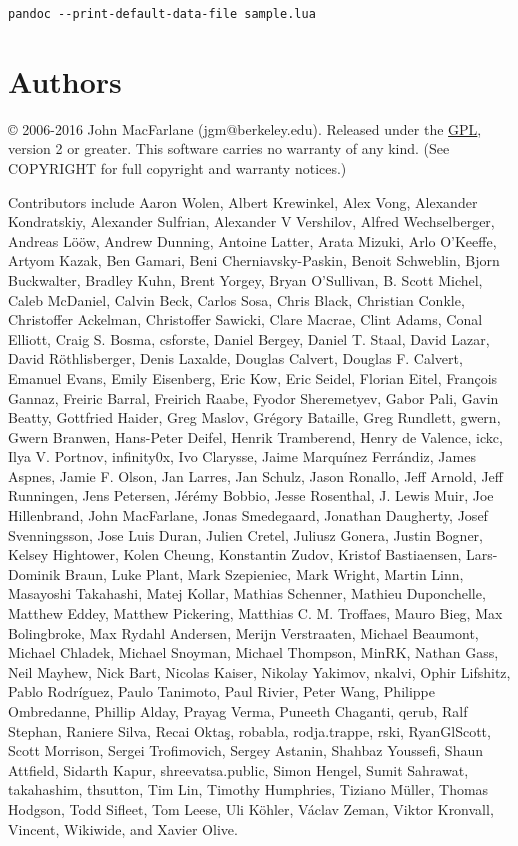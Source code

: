 \documentclass[]{article}
\begin{document}
\begin{verbatim}
pandoc --print-default-data-file sample.lua
\end{verbatim}

\section{Authors}\label{authors}

© 2006-2016 John MacFarlane (jgm@berkeley.edu). Released under the
\href{http://www.gnu.org/copyleft/gpl.html}{GPL}, version 2 or greater.
This software carries no warranty of any kind. (See COPYRIGHT for full
copyright and warranty notices.)

Contributors include Aaron Wolen, Albert Krewinkel, Alex Vong, Alexander
Kondratskiy, Alexander Sulfrian, Alexander V Vershilov, Alfred
Wechselberger, Andreas Lööw, Andrew Dunning, Antoine Latter, Arata
Mizuki, Arlo O'Keeffe, Artyom Kazak, Ben Gamari, Beni
Cherniavsky-Paskin, Benoit Schweblin, Bjorn Buckwalter, Bradley Kuhn,
Brent Yorgey, Bryan O'Sullivan, B. Scott Michel, Caleb McDaniel, Calvin
Beck, Carlos Sosa, Chris Black, Christian Conkle, Christoffer Ackelman,
Christoffer Sawicki, Clare Macrae, Clint Adams, Conal Elliott, Craig S.
Bosma, csforste, Daniel Bergey, Daniel T. Staal, David Lazar, David
Röthlisberger, Denis Laxalde, Douglas Calvert, Douglas F. Calvert,
Emanuel Evans, Emily Eisenberg, Eric Kow, Eric Seidel, Florian Eitel,
François Gannaz, Freiric Barral, Freirich Raabe, Fyodor Sheremetyev,
Gabor Pali, Gavin Beatty, Gottfried Haider, Greg Maslov, Grégory
Bataille, Greg Rundlett, gwern, Gwern Branwen, Hans-Peter Deifel, Henrik
Tramberend, Henry de Valence, ickc, Ilya V. Portnov, infinity0x, Ivo
Clarysse, Jaime Marquínez Ferrándiz, James Aspnes, Jamie F. Olson, Jan
Larres, Jan Schulz, Jason Ronallo, Jeff Arnold, Jeff Runningen, Jens
Petersen, Jérémy Bobbio, Jesse Rosenthal, J. Lewis Muir, Joe
Hillenbrand, John MacFarlane, Jonas Smedegaard, Jonathan Daugherty,
Josef Svenningsson, Jose Luis Duran, Julien Cretel, Juliusz Gonera,
Justin Bogner, Kelsey Hightower, Kolen Cheung, Konstantin Zudov, Kristof
Bastiaensen, Lars-Dominik Braun, Luke Plant, Mark Szepieniec, Mark
Wright, Martin Linn, Masayoshi Takahashi, Matej Kollar, Mathias
Schenner, Mathieu Duponchelle, Matthew Eddey, Matthew Pickering,
Matthias C. M. Troffaes, Mauro Bieg, Max Bolingbroke, Max Rydahl
Andersen, Merijn Verstraaten, Michael Beaumont, Michael Chladek, Michael
Snoyman, Michael Thompson, MinRK, Nathan Gass, Neil Mayhew, Nick Bart,
Nicolas Kaiser, Nikolay Yakimov, nkalvi, Ophir Lifshitz, Pablo
Rodríguez, Paulo Tanimoto, Paul Rivier, Peter Wang, Philippe Ombredanne,
Phillip Alday, Prayag Verma, Puneeth Chaganti, qerub, Ralf Stephan,
Raniere Silva, Recai Oktaş, robabla, rodja.trappe, rski, RyanGlScott,
Scott Morrison, Sergei Trofimovich, Sergey Astanin, Shahbaz Youssefi,
Shaun Attfield, Sidarth Kapur, shreevatsa.public, Simon Hengel, Sumit
Sahrawat, takahashim, thsutton, Tim Lin, Timothy Humphries, Tiziano
Müller, Thomas Hodgson, Todd Sifleet, Tom Leese, Uli Köhler, Václav
Zeman, Viktor Kronvall, Vincent, Wikiwide, and Xavier Olive.
\end{document}
